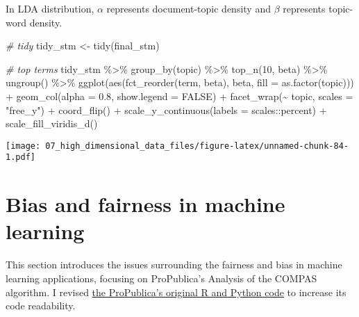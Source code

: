 \documentclass[
]{book}
\newenvironment{Shaded}{\begin{snugshade}}{\end{snugshade}}
\newcommand{\AttributeTok}[1]{\textcolor[rgb]{0.77,0.63,0.00}{#1}}
\newcommand{\CommentTok}[1]{\textcolor[rgb]{0.56,0.35,0.01}{\textit{#1}}}
\newcommand{\ConstantTok}[1]{\textcolor[rgb]{0.00,0.00,0.00}{#1}}
\newcommand{\DecValTok}[1]{\textcolor[rgb]{0.00,0.00,0.81}{#1}}
\newcommand{\FloatTok}[1]{\textcolor[rgb]{0.00,0.00,0.81}{#1}}
\newcommand{\FunctionTok}[1]{\textcolor[rgb]{0.00,0.00,0.00}{#1}}
\newcommand{\NormalTok}[1]{#1}
\newcommand{\OtherTok}[1]{\textcolor[rgb]{0.56,0.35,0.01}{#1}}
\newcommand{\SpecialCharTok}[1]{\textcolor[rgb]{0.00,0.00,0.00}{#1}}
\newcommand{\StringTok}[1]{\textcolor[rgb]{0.31,0.60,0.02}{#1}}
\begin{document}
In LDA distribution, \(\alpha\) represents document-topic density and \(\beta\) represents topic-word density.

\begin{Shaded}
\begin{Highlighting}[]
\CommentTok{\# tidy  }
\NormalTok{tidy\_stm }\OtherTok{\textless{}{-}} \FunctionTok{tidy}\NormalTok{(final\_stm)}

\CommentTok{\# top terms}
\NormalTok{tidy\_stm }\SpecialCharTok{\%\textgreater{}\%}
    \FunctionTok{group\_by}\NormalTok{(topic) }\SpecialCharTok{\%\textgreater{}\%}
    \FunctionTok{top\_n}\NormalTok{(}\DecValTok{10}\NormalTok{, beta) }\SpecialCharTok{\%\textgreater{}\%}
    \FunctionTok{ungroup}\NormalTok{() }\SpecialCharTok{\%\textgreater{}\%}
    \FunctionTok{ggplot}\NormalTok{(}\FunctionTok{aes}\NormalTok{(}\FunctionTok{fct\_reorder}\NormalTok{(term, beta), beta, }\AttributeTok{fill =} \FunctionTok{as.factor}\NormalTok{(topic))) }\SpecialCharTok{+}
    \FunctionTok{geom\_col}\NormalTok{(}\AttributeTok{alpha =} \FloatTok{0.8}\NormalTok{, }\AttributeTok{show.legend =} \ConstantTok{FALSE}\NormalTok{) }\SpecialCharTok{+}
    \FunctionTok{facet\_wrap}\NormalTok{(}\SpecialCharTok{\textasciitilde{}}\NormalTok{ topic, }\AttributeTok{scales =} \StringTok{"free\_y"}\NormalTok{) }\SpecialCharTok{+}
    \FunctionTok{coord\_flip}\NormalTok{() }\SpecialCharTok{+}
    \FunctionTok{scale\_y\_continuous}\NormalTok{(}\AttributeTok{labels =}\NormalTok{ scales}\SpecialCharTok{::}\NormalTok{percent) }\SpecialCharTok{+}
    \FunctionTok{scale\_fill\_viridis\_d}\NormalTok{()}
\end{Highlighting}
\end{Shaded}

\texttt{[image: 07\_high\_dimensional\_data\_files/figure-latex/unnamed-chunk-84-1.pdf]}

\hypertarget{bias-and-fairness-in-machine-learning}{%
\section{Bias and fairness in machine learning}\label{bias-and-fairness-in-machine-learning}}

This section introduces the issues surrounding the fairness and bias in machine learning applications, focusing on ProPublica's Analysis of the COMPAS algorithm. I revised \href{https://github.com/propublica/compas-analysis/blob/master/Compas\%20Analysis.ipynb}{the ProPublica's original R and Python code} to increase its code readability.
\end{document}
